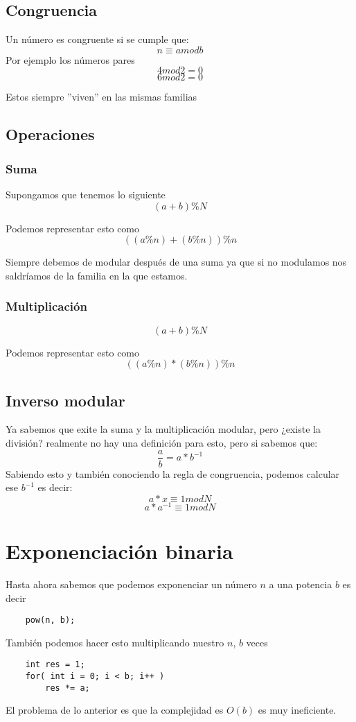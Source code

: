 \subsection{Congruencia}
Un número es congruente si se cumple que:
\[
    n \equiv a mod b
\]
Por ejemplo los números pares
\[
    4 mod 2 = 0
\]
\[
    6 mod 2 = 0
\]

Estos siempre ''viven'' en las mismas familias \newline

\subsection{Operaciones}
\subsubsection{Suma}
Supongamos que tenemos lo siguiente
\[
    (a + b) \% N    
\]

Podemos representar esto como 
\[
    ( ( a \% n ) + ( b \% n ) ) \% n    
\]

Siempre debemos de modular después de una suma ya que si no modulamos nos saldríamos de la familia en la que estamos.

\subsubsection{Multiplicación}
\[
    (a + b) \% N    
\]

Podemos representar esto como 
\[
    ( ( a \% n ) * ( b \% n ) ) \% n    
\]

\subsection{Inverso modular}
Ya sabemos que exite la suma y la multiplicación modular, pero ¿existe la división? realmente no hay una definición para esto, pero si sabemos que:
\[
    \frac{a}{b} = a*b^{-1}    
\]
Sabiendo esto y también conociendo la regla de congruencia, podemos calcular ese $b^{-1}$ es decir:
\[
    a * x \equiv 1 mod N    
\]
\[
    a * a^{-1} \equiv 1 mod N    
\]

\section{Exponenciación binaria}
Hasta ahora sabemos que podemos exponenciar un número $n$ a una potencia $b$ es decir 
\begin{lstlisting}
    pow(n, b);
\end{lstlisting}
También podemos hacer esto multiplicando nuestro $n$, $b$ veces 
\begin{lstlisting}
    int res = 1;
    for( int i = 0; i < b; i++ )
        res *= a;
\end{lstlisting}
El problema de lo anterior es que la complejidad es $O(b)$ es muy ineficiente. \newline 

